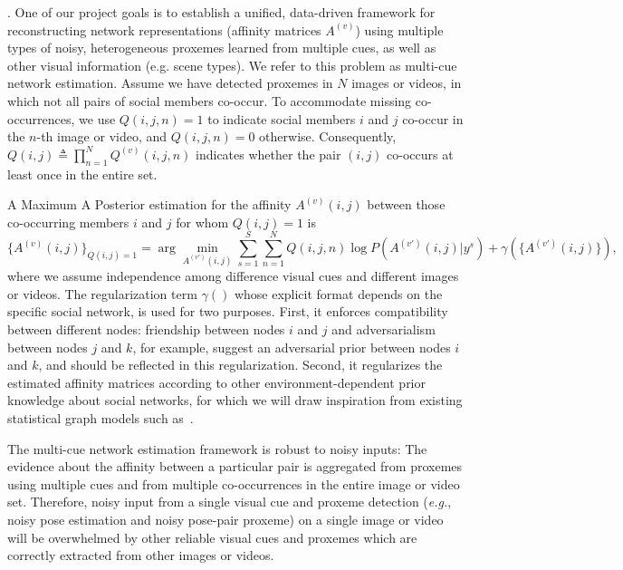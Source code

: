%


. One of our project goals is to establish a unified, data-driven framework for reconstructing network representations (affinity matrices $A^{(v)}$) using multiple types of noisy, heterogeneous proxemes learned from multiple cues, as well as other visual information (e.g. scene types). We refer to this problem as multi-cue network estimation. Assume we have detected proxemes in $N$ images or videos, in which not all pairs of social members co-occur. To accommodate missing co-occurrences, we use $Q(i,j,n)=1$ to indicate social members $i$ and $j$ co-occur in the $n$-th image or video, and $Q(i,j,n)=0$ otherwise. Consequently, $Q(i,j)\triangleq\prod_{n=1}^{N}Q^{(v)}(i,j,n)$ indicates whether the pair $(i, j)$ co-occurs at least once in the entire set.


A Maximum A Posterior estimation for the affinity $A^{(v)}(i,j)$ between those co-occurring members $i$ and $j$ for whom $Q (i,j)=1$ is
\begin{equation}
\{A^{(v)}(i,j)\}_{Q(i,j)=1}=\arg\!\!\!\!\!\min_{A^{(v')}(i,j)}\sum_{s=1}^{S}\sum_{n=1}^{N}Q(i,j,n)\log P(A^{(v')}(i,j)|y^s)+\gamma(\{A^{(v')}(i,j)\}),
\label{netestimate}
\end{equation}
where we assume independence among difference visual cues and different images or videos. The regularization term $\gamma()$ whose explicit format depends on the specific social network, is used for two purposes. First, it enforces compatibility between different nodes: friendship between nodes $i$ and $j$ and adversarialism between nodes $j$ and $k$, for example, suggest an adversarial prior between nodes $i$ and $k$, and should be reflected in this regularization. Second, it regularizes the estimated affinity matrices according to other environment-dependent prior knowledge about social networks, for which we will draw inspiration from existing statistical graph models such as~\cite{Goldenberg}.

The multi-cue network estimation framework is robust to noisy inputs: The evidence about the affinity between a particular pair is aggregated from proxemes using multiple cues and from multiple co-occurrences in the entire image or video set. Therefore, noisy input from a single visual cue and proxeme detection (\emph{e.g.}, noisy pose estimation and noisy pose-pair proxeme) on a single image or video will be overwhelmed by other reliable visual cues and proxemes which are correctly extracted from other images or videos.  

